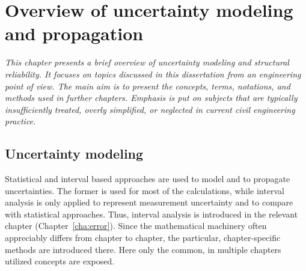 
\chapter{Overview of uncertainty modeling and propagation}
\label{cha:overview}

\ifpdf
    \graphicspath{{Chapter2/Figs/Raster/}{Chapter2/Figs/PDF/}{Chapter2/Figs/}}
\else
    \graphicspath{{Chapter2/Figs/Vector/}{Chapter2/Figs/}}
\fi

\leftskip=1cm
\noindent
\emph{This chapter presents a brief overview of uncertainty modeling and structural reliability. It focuses on topics discussed in this dissertation from an engineering point of view. The main aim is to present the concepts, terms, notations, and methods used in further chapters. Emphasis is put on subjects that are typically insufficiently treated, overly simplified, or neglected in current civil engineering practice.}

\leftskip=0pt\rightskip=0pt


\section{Uncertainty modeling}

Statistical and interval based approaches are used to model and to propagate uncertainties. The former is used for most of the calculations, while interval analysis is only applied to represent measurement uncertainty and to compare with statistical approaches. Thus, interval analysis is introduced in the relevant chapter (Chapter~\ref{cha:error}). Since the mathematical machinery often appreciably differs from chapter to chapter, the particular, chapter-specific methods are introduced there. Here only the common, in multiple chapters utilized concepts are exposed.

